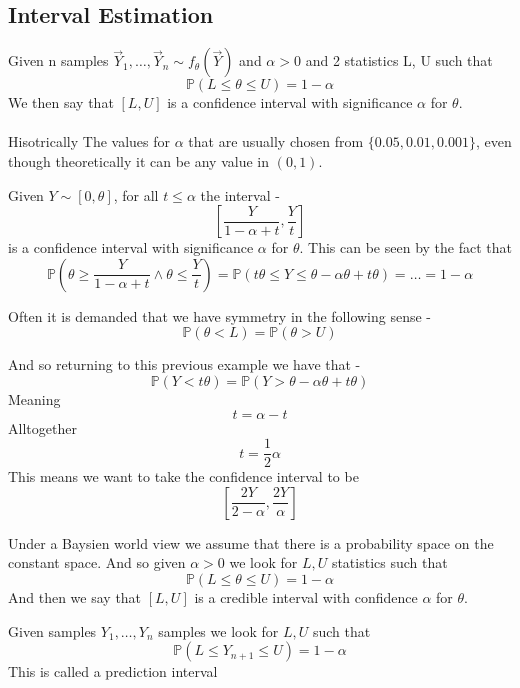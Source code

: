 \documentclass[../main.tex]{subfiles}
\begin{document}
\subsection{Interval Estimation}
\begin{definition}
Given n samples $\overrightarrow{Y}_1,\dots,  \overrightarrow{Y}_n\sim f_{\theta}(\overrightarrow{Y})$ and $\alpha>0$ and 2 statistics L, U such that
\[\mathbb{P}(L\leq \theta\leq U) = 1-\alpha\]
We then say that $[L,U]$ is a confidence interval with significance $\alpha$ for $\theta$.\\\\
Hisotrically The values for $\alpha$ that are usually chosen from $\{0.05, 0.01, 0.001\}$, even though theoretically it can be any value in $(0,1)$. 
\end{definition}
\begin{example}
Given $Y\sim [0,\theta]$, for all $t\leq\alpha$ the interval -
\[\left[\frac{Y}{1-\alpha +t}, \frac{Y}{t}\right]\]
is a confidence interval with significance $\alpha$ for $\theta$. This can be seen by the fact that 
\[\mathbb{P}\left(\theta\geq \frac{Y}{1-\alpha +t} \land \theta\leq\frac{Y}{t} \right) = \mathbb{P}\left( t\theta\leq Y\leq \theta- \alpha\theta+t\theta\right)=\dots=1-\alpha\]
\end{example}
\begin{definition}
Often it is demanded that we have symmetry in the following sense - 
\[\mathbb{P}(\theta<L) = \mathbb{P}(\theta>U)\]
\end{definition}
And so returning to this previous example we have that - 
\[\mathbb{P}(Y<t\theta) = \mathbb{P}(Y>\theta-\alpha\theta+t\theta)\]
Meaning
\[t = \alpha - t\]
Alltogether
\[t=\frac{1}{2}\alpha\]
This means we want to take the confidence interval to be 
\[\left[\frac{2Y}{2-\alpha}, \frac{2Y}{\alpha}\right]\]
\newpage
\begin{definition}
Under a Baysien world view we assume that there is a probability space on the constant space. And so given $\alpha>0$ we look for $L,U$ statistics such that
\[\mathbb{P}(L\leq\theta \leq U) = 1-\alpha\]
And then we say that $[L,U]$ is a credible interval with confidence $\alpha$ for $\theta$. 
\end{definition}
\begin{definition}
Given samples $Y_1,\dots, Y_n$ samples we look for $L,U$ such that
\[\mathbb{P}(L\leq Y_{n+1}\leq U) = 1-\alpha\]
This is called a prediction interval
\end{definition}
\end{document}
